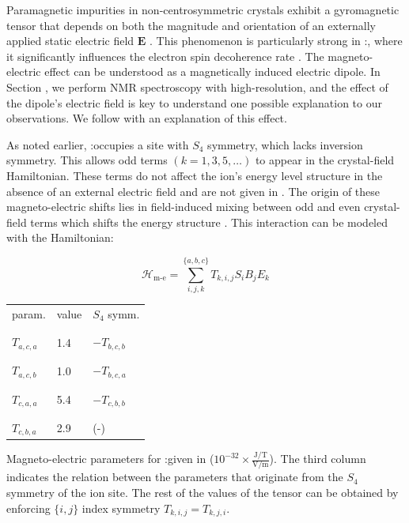 Paramagnetic impurities in non-centrosymmetric crystals exhibit a gyromagnetic tensor that depends on both the magnitude and orientation of an externally applied static electric field $\mathbf{E}$ . This phenomenon is particularly strong in \Er:\Ca {}, where it significantly influences the electron spin decoherence rate . The magneto-electric effect can be understood as a magnetically induced electric dipole. In Section , we perform NMR spectroscopy with high-resolution, and the effect of the dipole's electric field is key to understand one possible explanation to our observations. We follow with an explanation of this effect.

As noted earlier, \Er:\Ca occupies a site with $S_4$ symmetry, which lacks inversion symmetry. This allows odd terms $(k=1,3,5,\dots)$ to appear in the crystal-field Hamiltonian. These terms do not affect the ion's energy level structure in the absence of an external electric field and are not given in . The origin of these magneto-electric shifts lies in field-induced mixing between odd and even crystal-field terms which shifts the energy structure . This interaction can be modeled with the Hamiltonian:

\begin{equation}
    \mathcal{H}_{\text{m-e}} = \sum_{i,j,k}^{\{a,b,c\}} T_{k, i, j} S_{i} B_j E_k
\end{equation}

\begin{margintable}
\centering
\begin{tabular}{l|l|l}
param.         & value  & $S_4$ symm.   \\[-1em] \\ \hline \\[-1em]
$T_{a,c,a}$    & 1.4    & $-T_{b,c,b}$  \\[-1em] \\ \hline \\[-1em]
$T_{a,c,b}$    & 1.0    & $-T_{b,c,a}$  \\[-1em] \\ \hline \\[-1em]
$T_{c,a,a}$    & 5.4    & $-T_{c,b,b}$  \\[-1em] \\ \hline \\[-1em]
$T_{c,b,a}$    & 2.9    &  (-) 
\end{tabular}
\caption[Magneto-optic parameters]{Magneto-electric parameters for \Er:\Ca given in ($10^{-32} \times \frac{\text{J/T}}{\text{V/m}}$). The third column indicates the relation between the parameters that originate from the $S_4$ symmetry of the ion site. The rest of the values of the tensor can be obtained by enforcing $\{i, j\}$ index symmetry $T_{k, i, j} = T_{k, j, i}$.}
\end{margintable}

